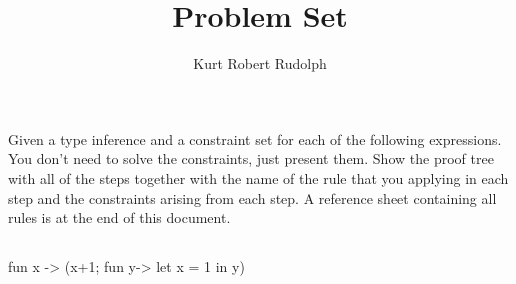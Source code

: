 \documentclass[11pt]{amsart}
\title{Problem Set}
\author{Kurt Robert Rudolph}
\date{}                                           %
\begin{document}
\maketitle

\section{}
	Given a type inference and a constraint set for each of the following expressions.  You don't need to solve the constraints, just present them.  Show the proof tree with all of the steps together with the name of the rule that you applying in each step and the constraints arising from each step.  A reference sheet containing all rules is at the end of this document.  
	\subsection{}
		\begin{program}
			fun x -> (x+1; fun y-> let x = 1 in y)
		\end{program}
	


\end{document}
